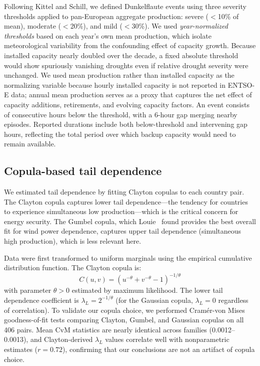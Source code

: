 \documentclass[sn-nature]{sn-jnl}%
\begin{document}
Following Kittel and Schill\cite{kittel2026}, we defined Dunkelflaute events using three severity thresholds applied to pan-European aggregate production: severe ($<$10\% of mean), moderate ($<$20\%), and mild ($<$30\%). We used \textit{year-normalized thresholds} based on each year's own mean production, which isolate meteorological variability from the confounding effect of capacity growth. Because installed capacity nearly doubled over the decade, a fixed absolute threshold would show spuriously vanishing droughts even if relative drought severity were unchanged. We used mean production rather than installed capacity as the normalizing variable because hourly installed capacity is not reported in ENTSO-E data; annual mean production serves as a proxy that captures the net effect of capacity additions, retirements, and evolving capacity factors. An event consists of consecutive hours below the threshold, with a 6-hour gap merging nearby episodes. Reported durations include both below-threshold and intervening gap hours, reflecting the total period over which backup capacity would need to remain available.

\subsection{Copula-based tail dependence}

We estimated tail dependence by fitting Clayton copulas to each country pair. The Clayton copula captures lower tail dependence---the tendency for countries to experience simultaneous low production---which is the critical concern for energy security. The Gumbel copula, which Louie~\cite{louie2014} found provides the best overall fit for wind power dependence, captures upper tail dependence (simultaneous high production), which is less relevant here.

Data were first transformed to uniform marginals using the empirical cumulative distribution function. The Clayton copula is:
\begin{equation}
    C(u,v) = (u^{-\theta} + v^{-\theta} - 1)^{-1/\theta}
\end{equation}
with parameter $\theta > 0$ estimated by maximum likelihood. The lower tail dependence coefficient is $\lambda_L = 2^{-1/\theta}$ (for the Gaussian copula, $\lambda_L = 0$ regardless of correlation). To validate our copula choice, we performed Cram\'er-von Mises goodness-of-fit tests comparing Clayton, Gumbel, and Gaussian copulas on all 406 pairs. Mean CvM statistics are nearly identical across families (0.0012--0.0013), and Clayton-derived $\lambda_L$ values correlate well with nonparametric estimates ($r = 0.72$), confirming that our conclusions are not an artifact of copula choice.
\end{document}
